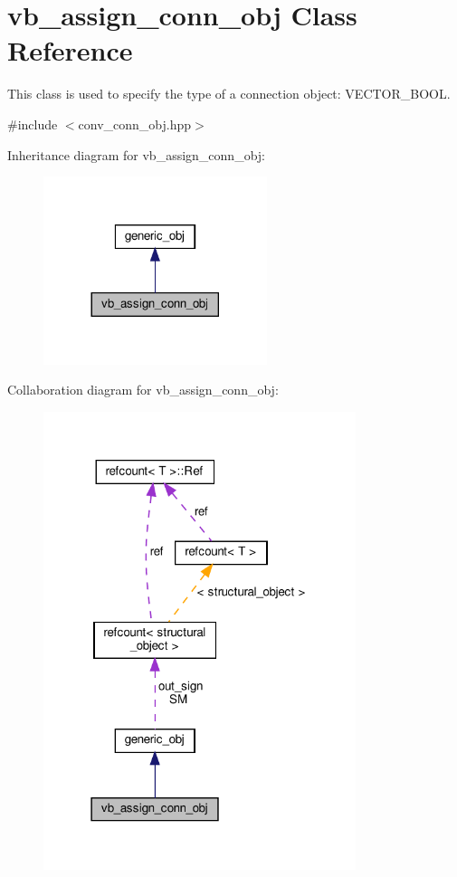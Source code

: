 \hypertarget{classvb__assign__conn__obj}{}\section{vb\+\_\+assign\+\_\+conn\+\_\+obj Class Reference}
\label{classvb__assign__conn__obj}


This class is used to specify the type of a connection object\+: V\+E\+C\+T\+O\+R\+\_\+\+B\+O\+OL.  




{\ttfamily \#include $<$conv\+\_\+conn\+\_\+obj.\+hpp$>$}



Inheritance diagram for vb\+\_\+assign\+\_\+conn\+\_\+obj\+:
\nopagebreak
\begin{figure}[H]
\begin{center}
\leavevmode
\includegraphics[width=185pt]{de/d97/classvb__assign__conn__obj__inherit__graph}
\end{center}
\end{figure}


Collaboration diagram for vb\+\_\+assign\+\_\+conn\+\_\+obj\+:
\nopagebreak
\begin{figure}[H]
\begin{center}
\leavevmode
\includegraphics[width=259pt]{d4/dc0/classvb__assign__conn__obj__coll__graph}
\end{center}
\end{figure}
